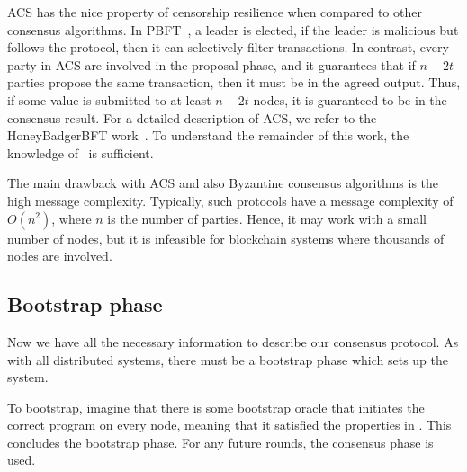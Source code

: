 ACS has the nice property of censorship resilience when compared to other consensus algorithms.
In PBFT~\cite{castro1999practical}, a leader is elected, if the leader is malicious but follows the protocol, then it can selectively filter transactions.
In contrast, every party in ACS are involved in the proposal phase,
and it guarantees that if $n - 2t$ parties propose the same transaction, then it must be in the agreed output.
Thus, if some value is submitted to at least $n - 2t$ nodes, it is guaranteed to be in the consensus result.
For a detailed description of ACS, we refer to the HoneyBadgerBFT work~\cite{miller2016honey}.
To understand the remainder of this work, the knowledge of~ is sufficient.

The main drawback with ACS and also Byzantine consensus algorithms is the high message complexity.
Typically, such protocols have a message complexity of $O(n^2)$, where $n$ is the number of parties.
Hence, it may work with a small number of nodes,
but it is infeasible for blockchain systems where thousands of nodes are involved.




\subsection{Bootstrap phase}
\label{sec:bootstrap}
Now we have all the necessary information to describe our consensus protocol.
As with all distributed systems, there must be a bootstrap phase which sets up the system.


To bootstrap, imagine that there is some bootstrap oracle that initiates the correct program on every node,
meaning that it satisfied the properties in .
This concludes the bootstrap phase.
For any future rounds, the consensus phase is used.

